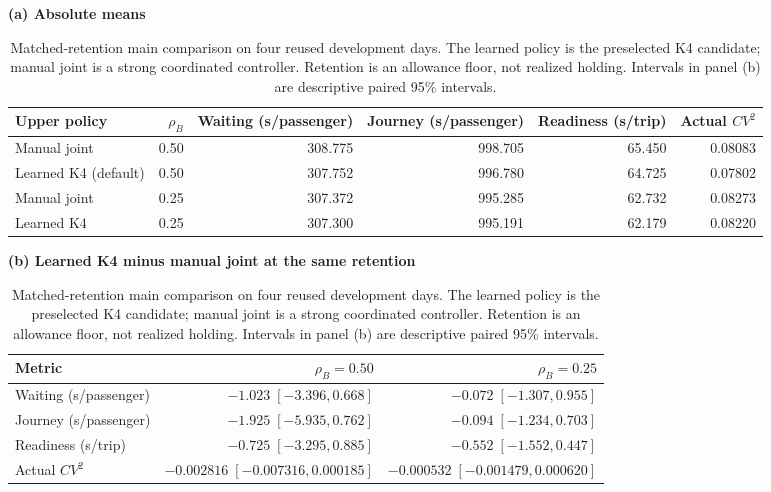 \begin{table}[t]
\centering
\caption{Matched-retention main comparison on four reused development days.
The learned policy is the preselected K4 candidate; manual joint is a strong
coordinated controller. Retention is an allowance floor, not realized holding.
Intervals in panel (b) are descriptive paired 95\% intervals.}
\label{tab:equal_budget}
\small
\textbf{(a) Absolute means}\par\smallskip
\setlength{\tabcolsep}{8pt}
\begin{tabular}{lrrrrr}
\toprule
Upper policy & $\rho_B$ & Waiting (s/passenger) & Journey (s/passenger) & Readiness (s/trip) & Actual $CV^2$ \\
\midrule
Manual joint & 0.50 & 308.775 & 998.705 & 65.450 & 0.08083 \\
Learned K4 (default) & 0.50 & 307.752 & 996.780 & 64.725 & 0.07802 \\
Manual joint & 0.25 & 307.372 & 995.285 & 62.732 & 0.08273 \\
Learned K4 & 0.25 & 307.300 & 995.191 & 62.179 & 0.08220 \\
\bottomrule
\end{tabular}
\par\medskip
\textbf{(b) Learned K4 minus manual joint at the same retention}\par\smallskip
\begin{tabular}{lrr}
\toprule
Metric & $\rho_B=0.50$ & $\rho_B=0.25$ \\
\midrule
Waiting (s/passenger) & $-1.023\;[-3.396,0.668]$ & $-0.072\;[-1.307,0.955]$ \\
Journey (s/passenger) & $-1.925\;[-5.935,0.762]$ & $-0.094\;[-1.234,0.703]$ \\
Readiness (s/trip) & $-0.725\;[-3.295,0.885]$ & $-0.552\;[-1.552,0.447]$ \\
Actual $CV^2$ & $-0.002816\;[-0.007316,0.000185]$ & $-0.000532\;[-0.001479,0.000620]$ \\
\bottomrule
\end{tabular}
\end{table}
